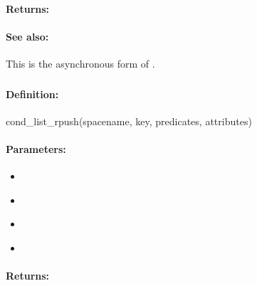 \paragraph{Returns:}


\paragraph{See also:}  This is the asynchronous form of .

\pagebreak
\subsubsection{}
\label{api:ruby:cond_list_rpush}


\paragraph{Definition:}
\begin{rubycode}
cond_list_rpush(spacename, key, predicates, attributes)
\end{rubycode}

\paragraph{Parameters:}
\begin{itemize}[noitemsep]
\item {}\\

\item {}\\

\item {}\\

\item {}\\

\end{itemize}

\paragraph{Returns:}


